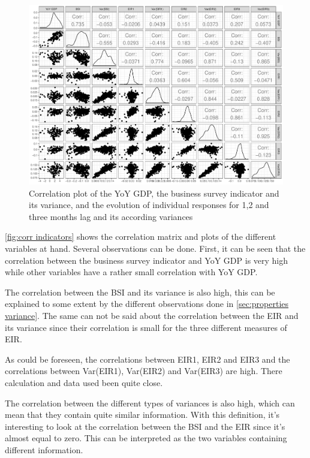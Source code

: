 \documentclass[12pt,a4paper,oneside]{book}
\begin{document}
\begin{figure}[H]
    \centering
    \includegraphics[scale=0.5]{Graphs/corr_indicators.pdf}
    \caption{Correlation plot of the YoY GDP, the business survey indicator and its variance, and the evolution of individual responses for 1,2 and three months lag and its according variances}
    \label{fig:corr indicators}
\end{figure}

\autoref{fig:corr indicators} shows the correlation matrix and plots of the different variables at hand. 
Several observations can be done.
First, it can be seen that the correlation between the business survey indicator and YoY GDP is very high while other variables have a rather small correlation with YoY GDP.

The correlation between the BSI and its variance is also high, this can be explained to some extent by the different observations done in \autoref{sec:properties variance}.
The same can not be said about the correlation between the EIR and its variance since their correlation is small for the three different measures of EIR.

As could be foreseen, the correlations between EIR1, EIR2 and EIR3 and the correlations between Var(EIR1), Var(EIR2) and Var(EIR3) are high. There calculation and data used been quite close.

The correlation between the different types of variances is also high, which can mean that they contain quite similar information.
With this definition, it's interesting to look at the correlation between the BSI and the EIR since it's almost equal to zero. This can be interpreted as the two variables containing different information.
\end{document}
